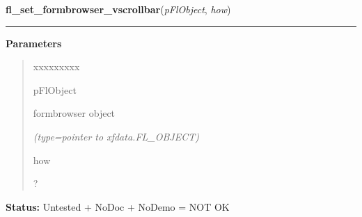 \hspace{.8\funcindent}\begin{boxedminipage}{\funcwidth}

    \raggedright \textbf{fl\_set\_formbrowser\_vscrollbar}(\textit{pFlObject}, \textit{how})

    \vspace{-1.5ex}

    \rule{\textwidth}{0.5\fboxrule}
\setlength{\parskip}{2ex}
\setlength{\parskip}{1ex}
      \textbf{Parameters}
      \vspace{-1ex}

      \begin{quote}
        \begin{Ventry}{xxxxxxxxx}

          \item[pFlObject]

          formbrowser object

            {\it (type=pointer to xfdata.FL\_OBJECT)}

          \item[how]

          ?

        \end{Ventry}

      \end{quote}

\textbf{Status:} Untested + NoDoc + NoDemo = NOT OK



    \end{boxedminipage}

    \label{xformslib:flformbrowser:fl_get_formbrowser_topform}

    \vspace{0.5ex}

